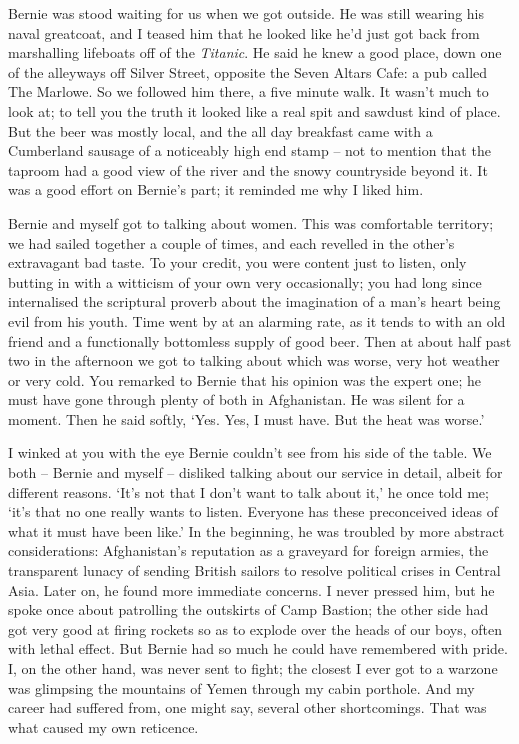 Bernie was stood waiting for us when we got outside. He was still wearing his naval greatcoat, and I teased him that he looked like he'd just got back from marshalling lifeboats off of the \textit{Titanic}. He said he knew a good place, down one of the alleyways off Silver Street, opposite the Seven Altars Cafe: a pub called The Marlowe. So we followed him there, a five minute walk. It wasn't much to look at; to tell you the truth it looked like a real spit and sawdust kind of place. But the beer was mostly local, and the all day breakfast came with a Cumberland sausage of a noticeably high end stamp -- not to mention that the taproom had a good view of the river and the snowy countryside beyond it. It was a good effort on Bernie's part; it reminded me why I liked him.

Bernie and myself got to talking about women. This was comfortable territory; we had sailed together a couple of times, and each revelled in the other's extravagant bad taste. To your credit, you were content just to listen, only butting in with a witticism of your own very occasionally; you had long since internalised the scriptural proverb about the imagination of a man's heart being evil from his youth. Time went by at an alarming rate, as it tends to with an old friend and a functionally bottomless supply of good beer. Then at about half past two in the afternoon we got to talking about which was worse, very hot weather or very cold. You remarked to Bernie that his opinion was the expert one; he must have gone through plenty of both in Afghanistan. He was silent for a moment. Then he said softly, `Yes. Yes, I must have. But the heat was worse.'

I winked at you with the eye Bernie couldn't see from his side of the table. We both -- Bernie and myself -- disliked talking about our service in detail, albeit for different reasons. `It's not that I don't want to talk about it,' he once told me; `it's that no one really wants to listen. Everyone has these preconceived ideas of what it must have been like.' In the beginning, he was troubled by more abstract considerations: Afghanistan's reputation as a graveyard for foreign armies, the transparent lunacy of sending British sailors to resolve political crises in Central Asia. Later on, he found more immediate concerns. I never pressed him, but he spoke once about patrolling the outskirts of Camp Bastion; the other side had got very good at firing rockets so as to explode over the heads of our boys, often with lethal effect. But Bernie had so much he could have remembered with pride. I, on the other hand, was never sent to fight; the closest I ever got to a warzone was glimpsing the mountains of Yemen through my cabin porthole. And my career had suffered from, one might say, several other shortcomings. That was what caused my own reticence.

